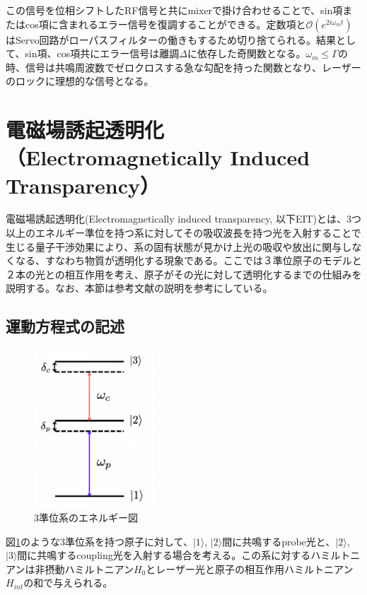 \documentclass[dvipdfmx]{jsreport}
\begin{document}
この信号を位相シフトしたRF信号と共にmixerで掛け合わせることで、sin項またはcos項に含まれるエラー信号を復調することができる。定数項と$\mathcal{O}(e^{2i\omega_m t})$はServo回路がローパスフィルターの働きもするため切り捨てられる。結果として、sin項、cos項共にエラー信号は離調$\Delta$に依存した奇関数となる。$\omega_m \leq \Gamma$の時、信号は共鳴周波数でゼロクロスする急な勾配を持った関数となり、レーザーのロックに理想的な信号となる。

\clearpage
\section{電磁場誘起透明化（Electromagnetically Induced Transparency）}
電磁場誘起透明化(Electromagnetically induced transparency, 以下EIT)とは、3つ以上のエネルギー準位を持つ系に対してその吸収波長を持つ光を入射することで生じる量子干渉効果により、系の固有状態が見かけ上光の吸収や放出に関与しなくなる、すなわち物質が透明化する現象である。ここでは３準位原子のモデルと２本の光との相互作用を考え、原子がその光に対して透明化するまでの仕組みを説明する。なお、本節は参考文献\cite{eit-pertubation}\cite{eit-absorption}の説明を参考にしている。
\subsection{運動方程式の記述}
\begin{figure}[hbtp]
\centering
\includegraphics[width=0.4\textwidth]{images/EIT_spectre.png}
\caption{\label{fig:eit-spectre}3準位系のエネルギー図}
\end{figure}

図\ref{fig:eit-spectre}のような3準位系を持つ原子に対して、$| 1 \rangle$, $| 2 \rangle$間に共鳴するprobe光と、$| 2 \rangle$, $| 3 \rangle$間に共鳴するcoupling光を入射する場合を考える。この系に対するハミルトニアンは非摂動ハミルトニアン$H_0$とレーザー光と原子の相互作用ハミルトニアン$H_{int}$の和で与えられる。
\end{document}
